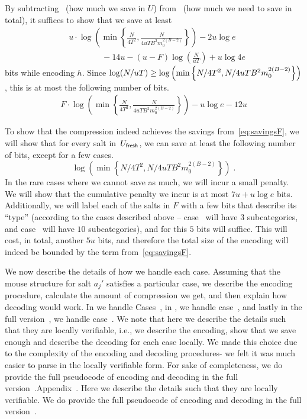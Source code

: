 By subtracting~ (how much we save in $U$) from~ (how much we need to save in total),  
it suffices to show that we save at least
\begin{align*}
 &u\cdot\log\left( \min\left\{\frac{N}{4T^2},\frac{N}{4uTB^2m_0^{2(B-2)}}\right\}\right) -2u\log e \\ &\qquad\qquad  -14u- (u-F)\log \left(\frac{N}{uT}\right) 
 + u\log 4e
 \end{align*}
   bits while encoding $h$.  Since $\log(N/uT)\geq \log\left(\min\left\{N/4T^2,N/4uTB^2m_0^{2(B-2)}\right\}\right)$, this is at most the following number of bits.
   \begin{align}
    F\cdot \log\left(\min\left\{\frac{N}{4T^2},\frac{N}{4uTB^2m_0^{2(B-2)}}\right\}\right)-u\log e-12u \label{eq:savingsF}
   \end{align}

To show that the compression indeed achieves the savings from~\eqref{eq:savingsF}, we will show that for every salt in~$U_\textsf{fresh}$, we can save at least the following number of bits, except for a few cases.
$$\log\left(\min\left\{N/4T^2,N/4uTB^2m_0^{2(B-2)}\right\}\right)\;.$$
  In the rare cases where we cannot save as much, we will incur a small penalty. We will show that the cumulative penalty we incur is at most $7u+u\log e$  bits. Additionally, we will label each of the salts in $F$ with a few bits that describe its ``type'' (according to the cases described above -- case~ will have $3$ subcategories, and case~ will have $10$ subcategories), and for this $5$ bits will suffice. This will cost, in total, another $5u$ bits, and therefore the total size of the encoding will indeed be bounded by the term from~\eqref{eq:savingsF}.





We now describe the details of how we handle each case. Assuming that the mouse structure for salt $a_j'$ satisfies a particular case, we describe the encoding procedure, calculate the amount of compression we get, and then explain how decoding would work. In  we handle Cases~, in , we handle case~, and lastly in \ifnum{} \else the full version~\cite{full}\fi, we handle case~. 
\ifnum{}
We note that here we describe the details such that they are locally verifiable, i.e., we describe the encoding, show that we save enough and describe the decoding for each case locally. We made this choice due to the complexity of the encoding and decoding procedures- we felt it was much easier to parse in the locally verifiable form. For sake of completeness, we do provide the full pseudocode of encoding and decoding in \ifnum{} the full version~\cite{full}.\else Appendix~.\fi
\else
Here we describe the details such that they are locally verifiable. We do provide the full pseudocode of encoding and decoding in the full version~\cite{full}.
\fi


